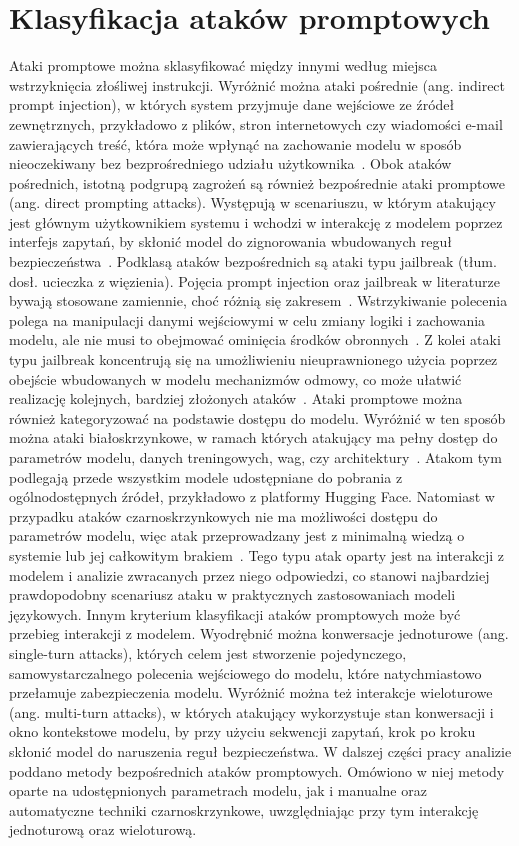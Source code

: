 \section{Klasyfikacja ataków promptowych}
Ataki promptowe można sklasyfikować między innymi według miejsca wstrzyknięcia złośliwej instrukcji. Wyróżnić można ataki pośrednie (ang. indirect prompt injection), w których system przyjmuje dane wejściowe ze źródeł zewnętrznych, przykładowo z plików, stron internetowych czy wiadomości e-mail zawierających treść, która może wpłynąć na zachowanie modelu w sposób nieoczekiwany bez bezprośredniego udziału użytkownika~\cite{owasp_llm_top10}. Obok ataków pośrednich, istotną podgrupą zagrożeń są również bezpośrednie ataki promptowe (ang. direct prompting attacks). Występują w scenariuszu, w którym atakujący jest głównym użytkownikiem systemu i wchodzi w interakcję z modelem poprzez interfejs zapytań, by skłonić model do zignorowania wbudowanych reguł bezpieczeństwa~\cite{nist_taxonomy_2025}.
Podklasą ataków bezpośrednich są ataki typu jailbreak (tłum. dosł. ucieczka z więzienia). Pojęcia prompt injection oraz jailbreak w literaturze bywają stosowane zamiennie, choć różnią się zakresem~\cite{owasp_llm_top10}. Wstrzykiwanie polecenia polega na manipulacji danymi wejściowymi w celu zmiany logiki i zachowania modelu, ale nie musi to obejmować ominięcia środków obronnych~\cite{owasp_llm_top10}. Z kolei ataki typu jailbreak koncentrują się na umożliwieniu nieuprawnionego użycia poprzez obejście wbudowanych w modelu mechanizmów odmowy, co może ułatwić realizację kolejnych, bardziej złożonych ataków~\cite{correia2026systematicliteraturereviewllm}.
Ataki promptowe można również kategoryzować na podstawie dostępu do modelu. Wyróżnić w ten sposób można ataki białoskrzynkowe, w ramach których atakujący ma pełny dostęp do parametrów modelu, danych treningowych, wag, czy architektury~\cite{chowdhury2024breakingdefensescomparativesurvey}. Atakom tym podlegają przede wszystkim modele udostępniane do pobrania z ogólnodostępnych źródeł, przykładowo z platformy Hugging Face. Natomiast w przypadku ataków czarnoskrzynkowych nie ma możliwości dostępu do parametrów modelu, więc atak przeprowadzany jest z minimalną wiedzą o systemie lub jej całkowitym brakiem~\cite{nist_taxonomy_2025}. Tego typu atak oparty jest na interakcji z modelem i analizie zwracanych przez niego odpowiedzi, co stanowi najbardziej prawdopodobny scenariusz ataku w praktycznych zastosowaniach modeli językowych.
Innym kryterium klasyfikacji ataków promptowych może być przebieg interakcji z modelem. Wyodrębnić można konwersacje jednoturowe (ang. single-turn attacks), których celem jest stworzenie pojedynczego, samowystarczalnego polecenia wejściowego do modelu, które natychmiastowo przełamuje zabezpieczenia modelu. Wyróżnić można też interakcje wieloturowe (ang. multi-turn attacks), w których atakujący wykorzystuje stan konwersacji i okno kontekstowe modelu, by przy użyciu sekwencji zapytań, krok po kroku skłonić model do naruszenia reguł bezpieczeństwa.
W dalszej części pracy analizie poddano metody bezpośrednich ataków promptowych. Omówiono w niej metody oparte na udostępnionych parametrach modelu, jak i manualne oraz automatyczne techniki czarnoskrzynkowe, uwzględniając przy tym interakcję jednoturową oraz wieloturową.